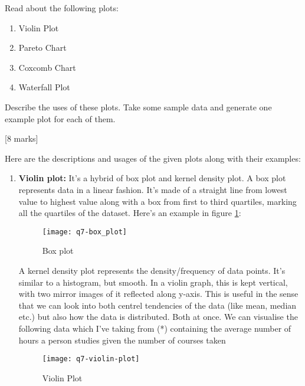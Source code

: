 \begin{que}
	Read about the following plots:
	\begin{enumerate}
		\item Violin Plot
		\item Pareto Chart
		\item Coxcomb Chart
		\item Waterfall Plot
	\end{enumerate}
	Describe the uses of these plots. Take some sample data and generate
	one example plot for each of them.

	\hspace*{\fill} [8 marks]
\end{que}

\begin{tcolorbox}[breakable]
	\begin{sol}
		Here are the descriptions and usages of the given plots along
		with their examples:
		\begin{enumerate}
			\item \textbf{Violin plot:} It's a hybrid of box plot
			      and kernel density plot. A box plot represents
			      data in a linear fashion. It's made of a straight
			      line from lowest value to highest value along
			      with a box from first to third quartiles, marking
			      all the quartiles of the dataset. Here's an
			      example in figure \ref{fig:box}:
			      \begin{figure}[H]
				      \centering
				      \texttt{[image: q7-box\_plot]}
				      \caption{Box plot}
				      \label{fig:box}
			      \end{figure}
			      A kernel density plot represents the
			      density/frequency of data points. It's similar to
			      a histogram, but smooth. In a violin graph, this
			      is kept vertical, with two mirror images of it
			      reflected along y-axis. This is useful in the
			      sense that we can look into both centrel
			      tendencies of the data (like mean, median etc.)
			      but also how the data is distributed. Both at
			      once. We can visualise the following data which
			      I've taking from (*) containing the average
			      number of hours a person studies given the number
			      of courses taken
			      \begin{figure}[H]
				      \centering
				      \texttt{[image: q7-violin-plot]}
				      \caption{Violin Plot}
				      \label{fig:violin}
			      \end{figure}

\end{enumerate}
\end{sol}
\end{tcolorbox}
